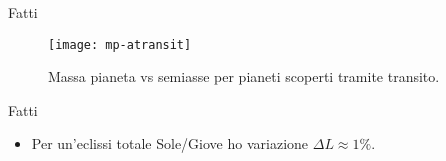 \begin{frame}{Fatti}
\begin{figure}[!ht]
\centering
\texttt{[image: mp-atransit]}
\caption{Massa pianeta vs semiasse per pianeti scoperti tramite transito.}
\end{figure}
\end{frame}

\begin{wordonframe}{Fatti}
\begin{itemize}
    \item Per un'eclissi totale Sole/Giove ho variazione $\Delta L\approx1\%$.
\end{itemize}
\end{wordonframe}